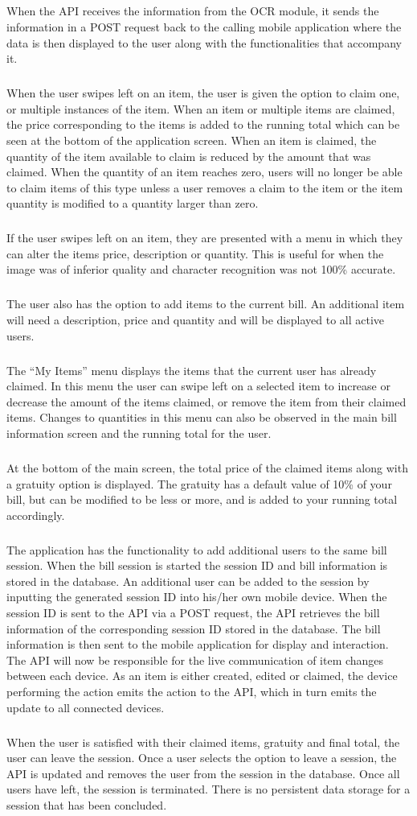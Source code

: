 \documentclass[12pt,a4paper]{article}
\begin{document}
\subparagraph{}
When the API receives the information from the OCR module, it sends the information in a POST request back to the calling mobile application where the data is then displayed to the user along with the functionalities that accompany it. 
\subparagraph{}
When the user swipes left on an item, the user is given the option to claim one, or multiple instances of the item. When an item or multiple items are claimed, the price corresponding to the items is added to the running total which can be seen at the bottom of the application screen. When an item is claimed, the quantity of the item available to claim is reduced by the amount that was claimed. When the quantity of an item reaches zero, users will no longer be able to claim items of this type unless a user removes a claim to the item or the item quantity is modified to a quantity larger than zero. 
\subparagraph{}
If the user swipes left on an item, they are presented with a menu in which they can alter the items price, description or quantity. This is useful for when the image was of inferior quality and character recognition was not 100\% accurate. 
\subparagraph{}
The user also has the option to add items to the current bill. An additional item will need a description, price and quantity and will be displayed to all active users. 
\subparagraph{}
The “My Items” menu displays the items that the current user has already claimed. In this menu the user can swipe left on a selected item to increase or decrease the amount of the items claimed, or remove the item from their claimed items. Changes to quantities in this menu can also be observed in the main bill information screen and the running total for the user. 
\subparagraph{}
At the bottom of the main screen, the total price of the claimed items along with a gratuity option is displayed. The gratuity has a default value of 10\% of your bill, but can be modified to be less or more, and is added to your running total accordingly.
\subparagraph{}
The application has the functionality to add additional users to the same bill session. When the bill session is started the session ID and bill information is stored in the database. An additional user can be added to the session by inputting the generated session ID into his/her own mobile device. When the session ID is sent to the API via a POST request, the API retrieves the bill information of the corresponding session ID stored in the database. The bill information is then sent to the mobile application for display and interaction. The API will now be responsible for the live communication of item changes between each device. As an item is either created, edited or claimed, the device performing the action emits the action to the API, which in turn emits the update to all connected devices.  
\subparagraph{}
When the user is satisfied with their claimed items, gratuity and final total, the user can leave the session. Once a user selects the option to leave a session, the API is updated and removes the user from the session in the database. Once all users have left, the session is terminated. There is no persistent data storage for a session that has been concluded.
\end{document}
